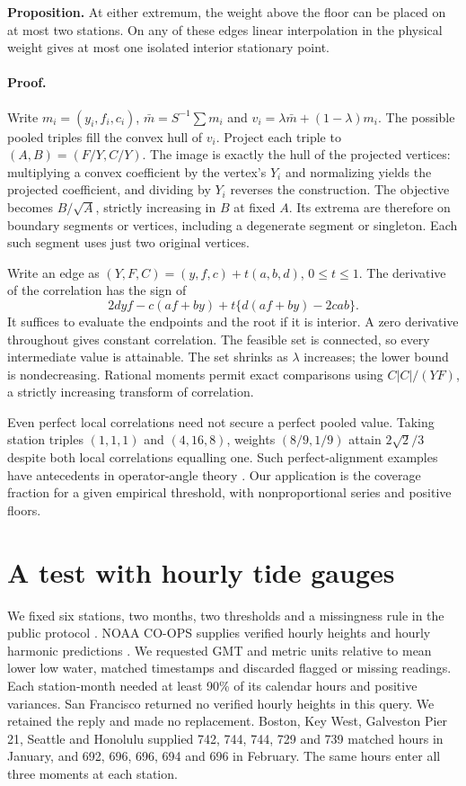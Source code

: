 \documentclass[11pt]{article}
\begin{document}
\textbf{Proposition.} At either extremum, the weight above the floor can be placed on at most two stations. On any of these edges linear interpolation in the physical weight gives at most one isolated interior stationary point.

\paragraph{Proof.} Write $m_i=(y_i,f_i,c_i)$, $\bar m=S^{-1}\sum m_i$ and $v_i=\lambda\bar m+(1-\lambda)m_i$. The possible pooled triples fill the convex hull of $v_i$. Project each triple to $(A,B)=(F/Y,C/Y)$. The image is exactly the hull of the projected vertices: multiplying a convex coefficient by the vertex's $Y_i$ and normalizing yields the projected coefficient, and dividing by $Y_i$ reverses the construction. The objective becomes $B/\sqrt A$, strictly increasing in $B$ at fixed $A$. Its extrema are therefore on boundary segments or vertices, including a degenerate segment or singleton. Each such segment uses just two original vertices.

Write an edge as $(Y,F,C)=(y,f,c)+t(a,b,d)$, $0\le t\le1$. The derivative of the correlation has the sign of
\[
 2dyf-c(af+by)+t\{d(af+by)-2cab\}.
\]
It suffices to evaluate the endpoints and the root if it is interior. A zero derivative throughout gives constant correlation. The feasible set is connected, so every intermediate value is attainable. The set shrinks as $\lambda$ increases; the lower bound is nondecreasing. Rational moments permit exact comparisons using $C|C|/(YF)$, a strictly increasing transform of correlation.

Even perfect local correlations need not secure a perfect pooled value. Taking station triples $(1,1,1)$ and $(4,16,8)$, weights $(8/9,1/9)$ attain $2\sqrt{2}/3$ despite both local correlations equalling one. Such perfect-alignment examples have antecedents in operator-angle theory \cite{angle}. Our application is the coverage fraction for a given empirical threshold, with nonproportional series and positive floors.

\section{A test with hourly tide gauges}
We fixed six stations, two months, two thresholds and a missingness rule in the public protocol \cite{protocol}. NOAA CO-OPS supplies verified hourly heights and hourly harmonic predictions \cite{noaa}. We requested GMT and metric units relative to mean lower low water, matched timestamps and discarded flagged or missing readings. Each station-month needed at least 90\% of its calendar hours and positive variances. San Francisco returned no verified hourly heights in this query. We retained the reply and made no replacement. Boston, Key West, Galveston Pier 21, Seattle and Honolulu supplied 742, 744, 744, 729 and 739 matched hours in January, and 692, 696, 696, 694 and 696 in February. The same hours enter all three moments at each station.
\end{document}
